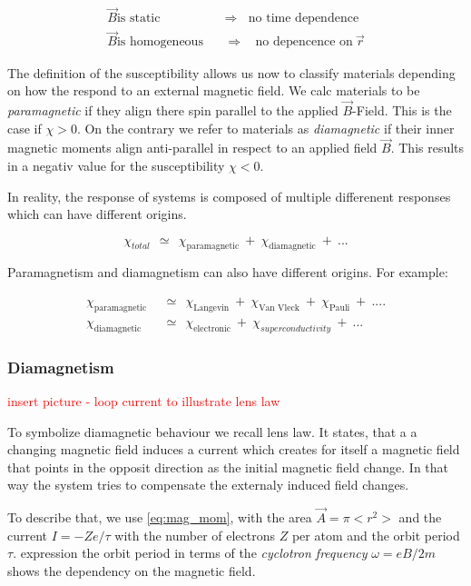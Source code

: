 \documentclass[10pt]{report}
\numberwithin{equation}{chapter}
\begin{document}
\begin{align*}
  \vec{B} \text{is static} ~~~~ &  \Rightarrow  ~~~~ \text{no time dependence}\\
  \vec{B} \text{is homogeneous} ~~~~ & \Rightarrow  ~~~~ \text{no depencence on}\ \vec{r}
\end{align*}


The definition of the susceptibility allows us now to classify materials depending on how the respond to an external magnetic field. We calc materials to be \textit{paramagnetic} if they align there spin parallel to the applied $\vec{B}$-Field. This is the case if $\chi > 0$. On the contrary we refer to materials as \textit{diamagnetic} if their inner magnetic moments align anti-parallel in respect to an applied field $\vec{B}$. This results in a negativ value for the susceptibility $\chi < 0$.

In reality, the response of systems is composed of multiple differenent responses which can have different origins.

\begin{equation}
  \chi_{total} ~~≃~~ \chi_\text{paramagnetic} ~+~ \chi_\text{diamagnetic} ~+~ ...
\end{equation}

Paramagnetism and diamagnetism can also have different origins. For example:

\begin{align*}
  \chi_\text{paramagnetic} ~~& ≃~~ \chi_\text{Langevin} ~+~ \chi_\text{Van Vleck} ~+~ \chi_\text{Pauli} ~+~ ....\\
  \chi_\text{diamagnetic} ~~& ≃~~ \chi_\text{electronic} ~+~ \chi_{superconductivity} ~+~ ...  
\end{align*}



\subsubsection{Diamagnetism}

\textcolor{red}{insert picture - loop current to illustrate lens law}

To symbolize diamagnetic behaviour we recall lens law. It states, that a a changing magnetic field induces a current which creates for itself a magnetic field that points in the opposit direction as the initial magnetic field change. In that way the system tries to compensate the externaly induced field changes.

To describe that, we use \ref{eq:mag_mom}, with the area $\vec{A} = \pi <r^2>$ and the current $I = -Z e/ \tau$ with the number of electrons $Z$ per atom and the orbit period $\tau$. expression the orbit period in terms of the \textit{cyclotron frequency} $\omega = eB/2m$ shows the dependency on the magnetic field.
\end{document}
